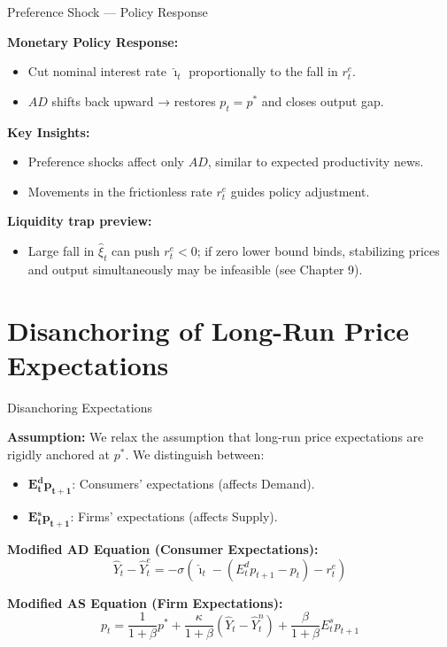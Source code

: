 \documentclass[11pt,aspectratio=169]{beamer}
\begin{document}
\begin{frame}[label=PrefShockPolicy]{Preference Shock — Policy Response}
\small

\textbf{Monetary Policy Response:}
\begin{itemize}
    \item Cut nominal interest rate $\hat{\imath}_t$ proportionally to the fall in $r^e_t$.
    \item $AD$ shifts back upward → restores $p_t = p^{\ast}$ and closes output gap.
\end{itemize}

\textbf{Key Insights:}
\begin{itemize}
    \item Preference shocks affect only $AD$, similar to expected productivity news.
    \item Movements in the frictionless rate $r^e_t$ guides policy adjustment.
\end{itemize}
\textbf{Liquidity trap preview:}
\begin{itemize}
    \item Large fall in $\hat{\xi}_t$ can push $r^e_t < 0$; if zero lower bound binds, stabilizing prices and output simultaneously may be infeasible (see Chapter 9).
\end{itemize}

\end{frame}

\section{Disanchoring of Long-Run Price Expectations}
\begin{frame}[label=ExpEquations]{Disanchoring Expectations}
\small

\textbf{Assumption:}
We relax the assumption that long-run price expectations are rigidly anchored at $p^{\ast}$. We distinguish between:
\begin{itemize}
    \item $\bm{E_{t}^{d}p_{t+1}}$: Consumers' expectations (affects Demand).
    \item $\bm{E_{t}^{s}p_{t+1}}$: Firms' expectations (affects Supply).
\end{itemize}
\vspace{0.3cm}

\textbf{Modified AD Equation (Consumer Expectations):}
\begin{equation*}
\hat{Y}_{t}-\hat{Y}_{t}^{e}=-\sigma \left( \hat{\imath}_{t}-(E_{t}^{d}p_{t+1}-p_{t})-r_{t}^{e}\right)
\end{equation*}

\textbf{Modified AS Equation (Firm Expectations):}
\begin{equation*}
p_{t}=\frac{1}{1+\beta }p^{\ast }+\frac{\kappa }{1+\beta }(\hat{Y}_{t}-\hat{Y}_{t}^{n})+\frac{\beta }{1+\beta }E_{t}^{s}p_{t+1}
\end{equation*}

\end{frame}
\end{document}
